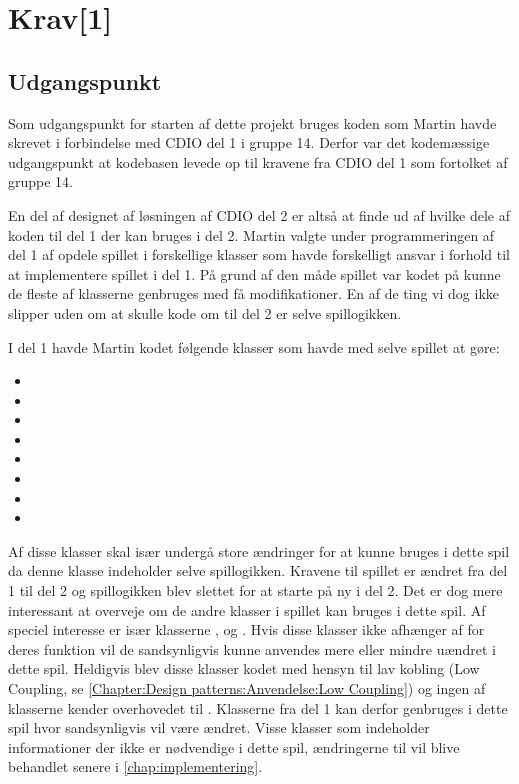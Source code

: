 \chapter{Krav[1]}\label{chap:krav}

\section{Udgangspunkt}\label{sec:krav:kravUdgangspunkt}
Som udgangspunkt for starten af dette projekt bruges koden som Martin havde skrevet i forbindelse med CDIO del 1 i gruppe 14. Derfor var det kodemæssige udgangspunkt at kodebasen levede op til kravene fra CDIO del 1 som fortolket af gruppe 14.

En del af designet af løsningen af CDIO del 2 er altså at finde ud af hvilke dele af koden til del 1 der kan bruges i del 2. Martin valgte under programmeringen af del 1 af opdele spillet i forskellige klasser som havde forskelligt ansvar i forhold til at implementere spillet i del 1. På grund af den måde spillet var kodet på kunne de fleste af klasserne genbruges med få modifikationer. En af de ting vi dog ikke slipper uden om at skulle kode om til del 2 er selve spillogikken.

I del 1 havde Martin kodet følgende klasser som havde med selve spillet at gøre:
\begin{itemize}
\item {}
\item {}
\item {}
\item {}
\item {}
\item {}
\item {}
\item {}
\end{itemize}

Af disse klasser skal især  undergå store ændringer for at kunne bruges i dette spil da denne klasse indeholder selve spillogikken. Kravene til spillet er ændret fra del 1 til del 2 og spillogikken blev slettet for at starte på ny i del 2. Det er dog mere interessant at overveje om de andre klasser i spillet kan bruges i dette spil. Af speciel interesse er især klasserne ,  og . Hvis disse klasser ikke afhænger af  for deres funktion vil de sandsynligvis kunne anvendes mere eller mindre uændret i dette spil. Heldigvis blev disse klasser kodet med hensyn til lav kobling (Low Coupling, se \vref{Chapter:Design patterns:Anvendelse:Low Coupling}) og ingen af klasserne kender overhovedet til . Klasserne fra del 1 kan derfor genbruges i dette spil hvor  sandsynligvis vil være ændret. Visse klasser som  indeholder informationer der ikke er nødvendige i dette spil, ændringerne til  vil blive behandlet senere i \vref{chap:implementering}.

